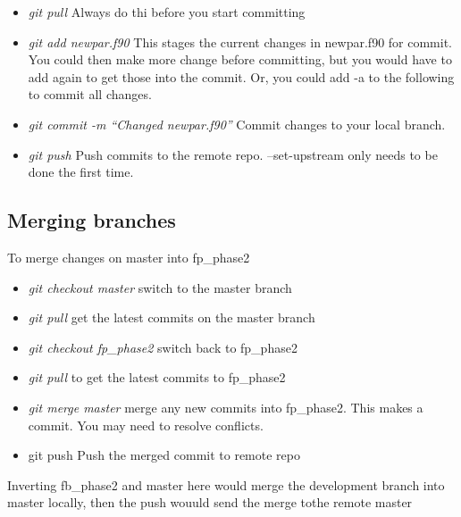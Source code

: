 \begin{itemize}

\item {\it git pull} Always do thi before you start committing

\item {\it git add newpar.f90} This stages the current changes in newpar.f90
  for  commit.  You could then make more change before committing,
  but you would have to add again to get those into the commit.
  Or, you could add -a to the following to commit all changes.

\item {\it git commit -m ``Changed newpar.f90''}  Commit changes to
  your local branch.

\item {\it git push} Push commits to the remote repo.
  --set-upstream only needs to be done the first time.

\end{itemize}

\subsection{Merging branches}

To merge changes on master into fp\_phase2

\begin{itemize}

\item {\it git checkout master}  switch to the master branch

\item {\it git pull} get the latest commits on the master branch

\item {\it git checkout fp\_phase2}  switch back to fp\_phase2 
  

\item {\it git pull} to get the latest commits to fp\_phase2

\item {\it git merge master} merge any new commits into fp\_phase2.
  This makes a commit.  You may need to resolve conflicts.
  
\item {git push} Push the merged commit to remote repo

  
\end{itemize}

Inverting fb\_phase2 and master here would merge the development branch
into master locally, then the push wouuld send the merge tothe remote master
